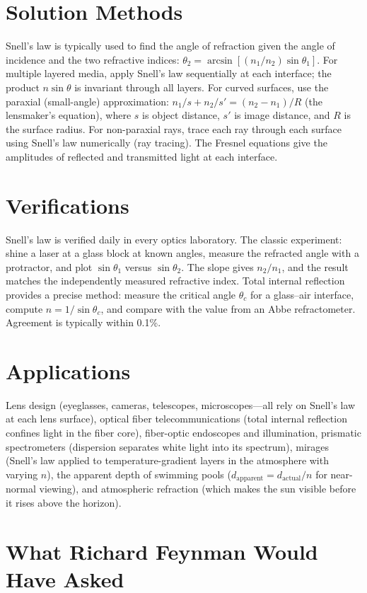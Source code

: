 \documentclass[11pt,openright]{book}
\begin{document}
\section*{Solution Methods}

Snell's law is typically used to find the angle of refraction given the angle of incidence and the two refractive indices: $\theta_2 = \arcsin[(n_1/n_2)\sin\theta_1]$. For multiple layered media, apply Snell's law sequentially at each interface; the product $n\sin\theta$ is invariant through all layers. For curved surfaces, use the paraxial (small-angle) approximation: $n_1/s + n_2/s' = (n_2 - n_1)/R$ (the lensmaker's equation), where $s$ is object distance, $s'$ is image distance, and $R$ is the surface radius. For non-paraxial rays, trace each ray through each surface using Snell's law numerically (ray tracing). The Fresnel equations give the amplitudes of reflected and transmitted light at each interface.
\section*{Verifications}

Snell's law is verified daily in every optics laboratory. The classic experiment: shine a laser at a glass block at known angles, measure the refracted angle with a protractor, and plot $\sin\theta_1$ versus $\sin\theta_2$. The slope gives $n_2/n_1$, and the result matches the independently measured refractive index. Total internal reflection provides a precise method: measure the critical angle $\theta_c$ for a glass--air interface, compute $n = 1/\sin\theta_c$, and compare with the value from an Abbe refractometer. Agreement is typically within 0.1\%.
\section*{Applications}

Lens design (eyeglasses, cameras, telescopes, microscopes---all rely on Snell's law at each lens surface), optical fiber telecommunications (total internal reflection confines light in the fiber core), fiber-optic endoscopes and illumination, prismatic spectrometers (dispersion separates white light into its spectrum), mirages (Snell's law applied to temperature-gradient layers in the atmosphere with varying $n$), the apparent depth of swimming pools ($d_{\text{apparent}} = d_{\text{actual}}/n$ for near-normal viewing), and atmospheric refraction (which makes the sun visible before it rises above the horizon).
\section*{What Richard Feynman Would Have Asked}
\end{document}
